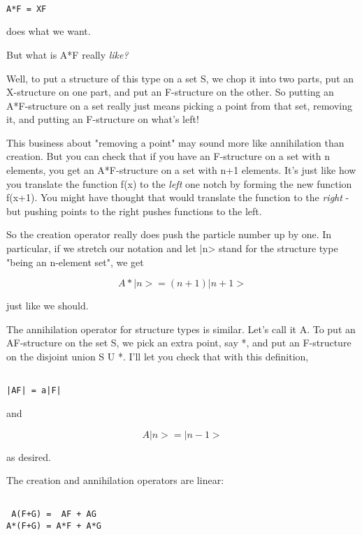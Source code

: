 \begin{verbatim}

A*F = XF
\end{verbatim}
    
does what we want.

But what is A*F really \emph{like?}

Well, to put a structure of this type on a set S, we chop it into two
parts, put an X-structure on one part, and put an F-structure on the
other.  So putting an A*F-structure on a set really just means picking 
a point from that set, removing it, and putting an F-structure on what's
left!

This business about "removing a point" may sound more like
annihilation than creation.  But you can check that if you have an
F-structure on a set with n elements, you get an A*F-structure on a set
with n+1 elements. It's just like how you translate the function f(x) to
the \emph{left} one notch by forming the new function f(x+1).  You might have
thought that would translate the function to the \emph{right} - but pushing
points to the right pushes functions to the left.

So the creation operator really does push the particle number up by one.
In  particular, if we stretch our notation and let |n> stand for the
structure type "being an n-element set", we get


$$

A*|n> = (n+1) |n+1>
$$
    
just like we should. 

The annihilation operator for structure types is similar.  Let's call it
A.  To put an AF-structure on the set S, we pick an extra point, say *,
and put an F-structure on the disjoint union S U {*}.  I'll let you
check that with this definition,


\begin{verbatim}

|AF| = a|F|
\end{verbatim}
    
and


$$

A|n> = |n-1>
$$
    
as desired.

The creation and annihilation operators are linear:


\begin{verbatim}

 A(F+G) =  AF + AG
A*(F+G) = A*F + A*G
\end{verbatim}
    
